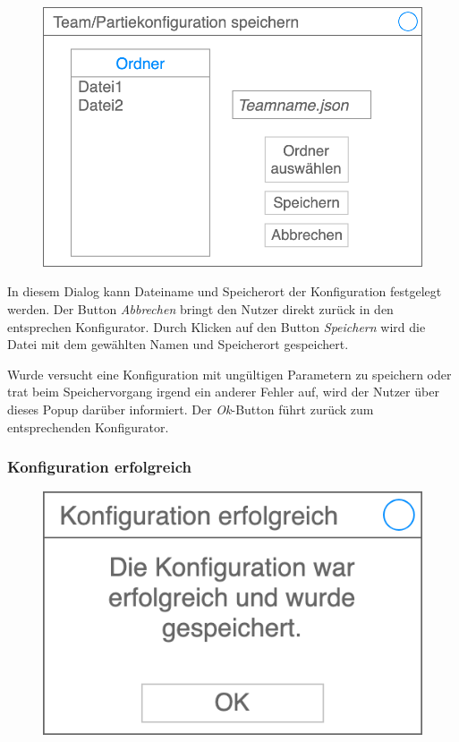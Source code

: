     \begin{figure}[H]
        \centering
        \includegraphics[width=\textwidth/2]{images/speichern}
    \end{figure}

    In diesem Dialog kann Dateiname und Speicherort der Konfiguration festgelegt werden. Der Button \textit{Abbrechen} bringt den Nutzer direkt zurück in den entsprechen Konfigurator. Durch Klicken auf den Button \textit{Speichern} wird die Datei mit dem gewählten Namen und Speicherort gespeichert.

    Wurde versucht eine Konfiguration mit ungültigen Parametern zu speichern oder trat beim Speichervorgang irgend ein anderer Fehler auf, wird der Nutzer über dieses Popup darüber informiert. Der \textit{Ok}-Button führt zurück zum entsprechenden Konfigurator.

    \subsubsection{Konfiguration erfolgreich}

    \begin{figure}[H]
        \centering
        \includegraphics[width=\textwidth/2]{images/konfiguration_erfolgreich}
    \end{figure}

